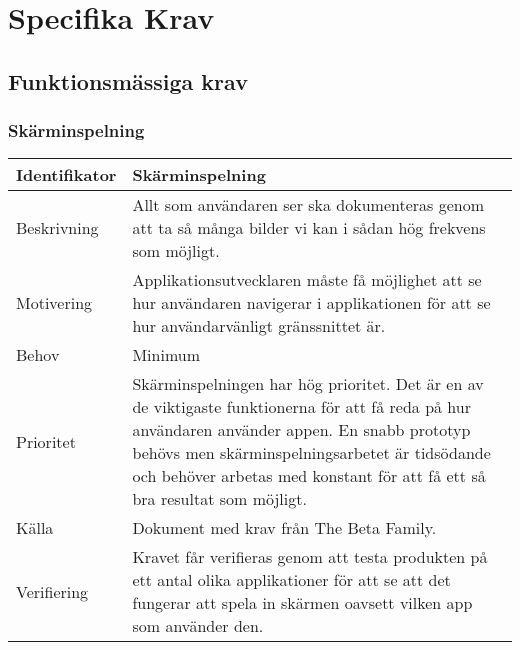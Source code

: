 \section{Specifika Krav}

\subsection{Funktionsmässiga krav}

\subsubsection{Skärminspelning}
\begin{tabular}{ | p{65pt} | p{300pt} |}
  \hline
  Identifikator &
Skärminspelning
\\ \hline
  Beskrivning & 
Allt som användaren ser ska dokumenteras genom att ta så många bilder vi kan i sådan hög frekvens som möjligt.
  \\ \hline
  Motivering &
Applikationsutvecklaren måste få möjlighet att se hur användaren navigerar i applikationen för att se hur användarvänligt gränssnittet är.
  \\ \hline
  Behov &
Minimum
  \\ \hline
  Prioritet &  
Skärminspelningen har hög prioritet. Det är en av de viktigaste funktionerna för att få reda på hur användaren använder appen. En snabb prototyp behövs men skärminspelningsarbetet är tidsödande och behöver arbetas med konstant för att få ett så bra resultat som möjligt.
  \\ \hline
  Källa &
Dokument med krav från The Beta Family.
  \\ \hline
  Verifiering &
Kravet får verifieras genom att testa produkten på ett antal olika applikationer för att se att det fungerar att spela in skärmen oavsett vilken app som använder den.
  \\ \hline
\end{tabular}

